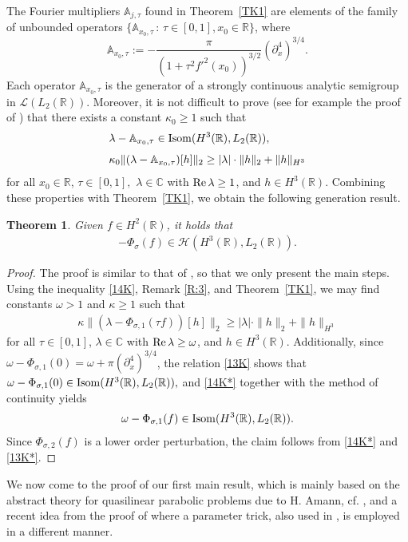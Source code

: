 \documentclass[11pt,reqno]{amsart}
\numberwithin{equation}{section}
\newcommand{\re}{\mathop{\rm Re}\nolimits}
\newcommand{\0}{\Omega}
\newcommand{\p}{\partial}
\newcommand{\bA}{\mathbb{A}}
\newcommand{\kH}{\mathcal{H}}
\newcommand{\kL}{\mathcal{L}}
\newcommand{\C}{\mathbb{C}}
\newcommand{\R}{\mathbb{R}}
\newtheorem{thm}{Theorem}[section]
\numberwithin{equation}{section}
\begin{document}
The Fourier multipliers $\bA_{j,\tau}$ found in Theorem~\ref{TK1} are elements of the  family of unbounded operators $\{\bA_{ x_0,\tau}\,:\, \tau\in[0,1], x_0\in\R\}$, where 
\[
\bA_{x_0,\tau}:=-\frac{\pi}{(1+\tau^2 f'^2(x_0))^{3/2}}(\p_x^4)^{3/4}.
\]
Each operator $\bA_{x_0,\tau}$ is the  generator of a strongly continuous analytic semigroup in $\kL(L_2(\R)).$
Moreover,  it is not difficult to prove (see for example  the proof  of \cite[Proposition~6.3]{M16x}) that there exists a constant  $\kappa_0\geq1$  such that  
  \begin{align}\label{13K}
&\lambda-\bA_{x_0,\tau}\in{\rm Isom}(H^3(\R), L_2(\R)),\\[1ex]
\label{14K}
& \kappa_0\|(\lambda-\bA_{x_0,\tau})[h]\|_{2}\geq  |\lambda|\cdot\|h\|_{2}+\|h\|_{H^3}
\end{align}
for all $x_0\in\R$, $\tau\in[0,1],$   $\lambda\in\C$ with $\re \lambda\geq 1$, and $h\in H^3(\R)$.
Combining these properties with Theorem~\ref{TK1}, we obtain the following generation result.
\begin{thm}\label{TK2}
Given $f\in H^2(\R)$, it holds that 
 \begin{align*} 
  -\Phi_{\sigma}(f)\in \kH(H^3(\R), L_2(\R)).
 \end{align*}
\end{thm}
\begin{proof}
 The proof is similar to that of \cite[Theorem~6.3]{M16x}, so that we only present the main steps. 
 Using the inequality   \eqref{14K}, Remark \ref{R:3}, and   Theorem~\ref{TK1},  we may find constants $\omega>1$ and $\kappa\geq1$ such that 
 \begin{align}\label{14K*}
\kappa\|(\lambda-\Phi_{\sigma,1}(\tau f))[h]\|_{2}\geq  |\lambda|\cdot\|h\|_{2}+\|h\|_{H^3}
\end{align}
for all $\tau\in[0,1]$, $\lambda\in\C$ with $\re \lambda\geq \omega$, and $h\in H^3(\R)$.
Additionally, since $\omega-\Phi_{\sigma,1}(0)=\omega+\pi(\p_x^4)^{3/4}$, the relation \eqref{13K} shows that $\omega-\Phi_{\sigma,1}(0)\in{\rm Isom}(H^3(\R), L_2(\R)),$ and \eqref{14K*} together with  the method of continuity yields 
 \begin{align}\label{13K*}
\omega-\Phi_{\sigma,1}(f)\in{\rm Isom}(H^3(\R), L_2(\R)).
\end{align}
Since $\Phi_{\sigma,2}(f)$ is a lower order perturbation, the claim follows from \eqref{14K*} and \eqref{13K*}. 
\end{proof}


We now come to the proof of our  first main result, which is mainly based on the abstract theory for  quasilinear parabolic problems   due to H. Amann, cf.  \cite[Section 12]{Am93}, and a recent  idea from  the proof of \cite[Theorem~1.3]{M16x}
where a parameter  trick, also used in   \cite{An90, ES96, PSS15},  is employed in a different manner.  
\end{document}
